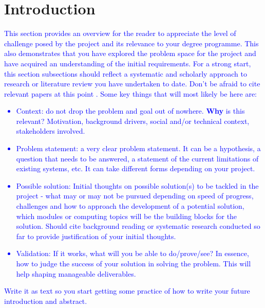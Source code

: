 \documentclass[acmtog, nonacm]{acmart}
\begin{document}


\maketitle

\section{Introduction}
\textcolor{blue}{This section provides an overview for the reader to appreciate the level of challenge posed by the project and its relevance to your degree programme. 
This also demonstrates that you have explored the problem space for the project and have acquired an understanding of the initial requirements.
For a strong start, this section subsections should reflect a systematic and scholarly approach to research or literature review you have undertaken to date.
Don't be afraid to cite relevant papers at this point \cite{graphics}.
Some key things that will most likely be here are:
\begin{itemize}
    \item Context: do not drop the problem and goal out of nowhere. \textbf{Why} is this relevant? Motivation, background drivers, social and/or technical context, stakeholders involved.
    \item Problem statement: a very clear problem statement. It can be a hypothesis, a question that needs to be answered, a statement of the current limitations of existing systems, etc. It can take different forms depending on your project.
    \item Possible solution: Initial thoughts on possible solution(s) to be tackled in the project - what may or may not be pursued depending on speed of progress, challenges and how to approach the development of a potential solution, which modules or computing topics will be the building blocks for the solution.
    Should cite background reading or systematic research conducted so far to provide justification of your initial thoughts.
    \item Validation: If it works, what will you be able to do/prove/see? In essence, how to judge the success of your solution in solving the problem. This will help shaping manageable deliverables. 
\end{itemize}
Write it as text so you start getting some practice of how to write your future introduction and abstract.
}
\end{document}
